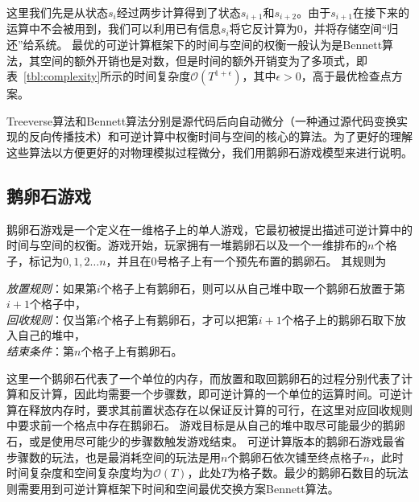 \documentclass[A4,twoside,fontset=ubuntu,UTF8]{ctexart}
\newcommand{\bigO}{{\mathcal{O}}}
\begin{document}
这里我们先是从状态$s_i$经过两步计算得到了状态$s_{i+1}$和$s_{i+2}$。由于$s_{i+1}$在接下来的运算中不会被用到，我们可以利用已有信息$s_i$将它反计算为$0$，并将存储空间“归还”给系统。
最优的可逆计算框架下的时间与空间的权衡一般认为是Bennett算法，其空间的额外开销也是对数，但是时间的额外开销变为了多项式，即表~\ref{tbl:complexity}所示的时间复杂度$\bigO(T^{1+\epsilon})$，其中$\epsilon > 0$，高于最优检查点方案。

Treeverse算法和Bennett算法分别是源代码后向自动微分（一种通过源代码变换实现的反向传播技术）和可逆计算中权衡时间与空间的核心的算法。为了更好的理解这些算法以方便更好的对物理模拟过程微分，我们用鹅卵石游戏模型来进行说明。

 

\subsection{鹅卵石游戏}
鹅卵石游戏是一个定义在一维格子上的单人游戏，它最初被提出描述可逆计算中的时间与空间的权衡。游戏开始，玩家拥有一堆鹅卵石以及一个一维排布的$n$个格子，标记为$0,1,2\ldots n$，并且在$0$号格子上有一个预先布置的鹅卵石。
其规则为
\begin{tcolorbox}[width=\textwidth, title=鹅卵石游戏-可逆计算版本]
    \textit{放置规则}：如果第$i$个格子上有鹅卵石，则可以从自己堆中取一个鹅卵石放置于第$i+1$个格子中，\\
    \textit{回收规则}：仅当第$i$个格子上有鹅卵石，才可以把第$i+1$个格子上的鹅卵石取下放入自己的堆中，\\
    \textit{结束条件}：第$n$个格子上有鹅卵石。
\end{tcolorbox}
这里一个鹅卵石代表了一个单位的内存，而放置和取回鹅卵石的过程分别代表了计算和反计算，因此均需要一个步骤数，即可逆计算的一个单位的运算时间。可逆计算在释放内存时，要求其前置状态存在以保证反计算的可行，在这里对应回收规则中要求前一个格点中存在鹅卵石。
游戏目标是从自己的堆中取尽可能最少的鹅卵石，或是使用尽可能少的步骤数触发游戏结束。
可逆计算版本的鹅卵石游戏最省步骤数的玩法，也是最消耗空间的玩法是用$n$个鹅卵石依次铺至终点格子$n$，此时时间复杂度和空间复杂度均为$\bigO(T)$，此处$T$为格子数。最少的鹅卵石数目的玩法则需要用到可逆计算框架下时间和空间最优交换方案Bennett算法。
\end{document}
